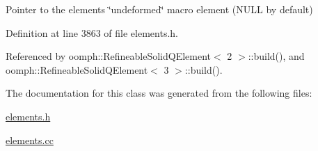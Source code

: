 Pointer to the element\textquotesingle{}s \char`\"{}undeformed\char`\"{} macro element (N\+U\+LL by default) 



Definition at line 3863 of file elements.\+h.



Referenced by oomph\+::\+Refineable\+Solid\+Q\+Element$<$ 2 $>$\+::build(), and oomph\+::\+Refineable\+Solid\+Q\+Element$<$ 3 $>$\+::build().



The documentation for this class was generated from the following files\+:\begin{DoxyCompactItemize}
\item 
\hyperlink{elements_8h}{elements.\+h}\item 
\hyperlink{elements_8cc}{elements.\+cc}\end{DoxyCompactItemize}
